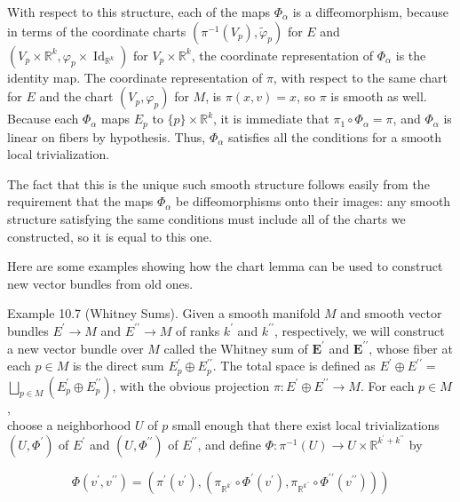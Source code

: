 \documentclass[10pt]{article}
\begin{document}
With respect to this structure, each of the maps $\Phi_{\alpha}$ is a diffeomorphism, because in terms of the coordinate charts $\left(\pi^{-1}\left(V_{p}\right), \widetilde{\varphi}_{p}\right)$ for $E$ and $\left(V_{p} \times \mathbb{R}^{k}, \varphi_{p} \times \operatorname{Id}_{\mathbb{R}^{k}}\right)$ for $V_{p} \times \mathbb{R}^{k}$, the coordinate representation of $\Phi_{\alpha}$ is the identity map. The coordinate representation of $\pi$, with respect to the same chart for $E$ and the chart $\left(V_{p}, \varphi_{p}\right)$ for $M$, is $\pi(x, v)=x$, so $\pi$ is smooth as well. Because each $\Phi_{\alpha}$ maps $E_{p}$ to $\{p\} \times \mathbb{R}^{k}$, it is immediate that $\pi_{1} \circ \Phi_{\alpha}=\pi$, and $\Phi_{\alpha}$ is linear on fibers by hypothesis. Thus, $\Phi_{\alpha}$ satisfies all the conditions for a smooth local trivialization.

The fact that this is the unique such smooth structure follows easily from the requirement that the maps $\Phi_{\alpha}$ be diffeomorphisms onto their images: any smooth structure satisfying the same conditions must include all of the charts we constructed, so it is equal to this one.

Here are some examples showing how the chart lemma can be used to construct new vector bundles from old ones.

Example 10.7 (Whitney Sums). Given a smooth manifold $M$ and smooth vector bundles $E^{\prime} \rightarrow M$ and $E^{\prime \prime} \rightarrow M$ of ranks $k^{\prime}$ and $k^{\prime \prime}$, respectively, we will construct a new vector bundle over $M$ called the Whitney sum of $\boldsymbol{E}^{\prime}$ and $\boldsymbol{E}^{\prime \prime}$, whose fiber at each $p \in M$ is the direct sum $E_{p}^{\prime} \oplus E_{p}^{\prime \prime}$. The total space is defined as $E^{\prime} \oplus E^{\prime \prime}=$ $\bigsqcup_{p \in M}\left(E_{p}^{\prime} \oplus E_{p}^{\prime \prime}\right)$, with the obvious projection $\pi: E^{\prime} \oplus E^{\prime \prime} \rightarrow M$. For each $p \in M$,\\
choose a neighborhood $U$ of $p$ small enough that there exist local trivializations $\left(U, \Phi^{\prime}\right)$ of $E^{\prime}$ and $\left(U, \Phi^{\prime \prime}\right)$ of $E^{\prime \prime}$, and define $\Phi: \pi^{-1}(U) \rightarrow U \times \mathbb{R}^{k^{\prime}+k^{\prime \prime}}$ by

$$
\Phi\left(v^{\prime}, v^{\prime \prime}\right)=\left(\pi^{\prime}\left(v^{\prime}\right),\left(\pi_{\mathbb{R}^{k^{\prime}}} \circ \Phi^{\prime}\left(v^{\prime}\right), \pi_{\mathbb{R}^{k^{\prime \prime}}} \circ \Phi^{\prime \prime}\left(v^{\prime \prime}\right)\right)\right)
$$
\end{document}
